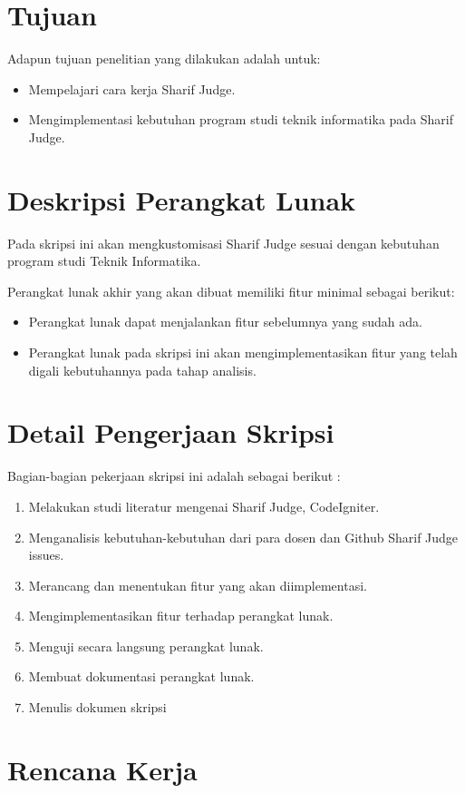 \documentclass[a4paper,twoside]{article}
\begin{document}
\section{Tujuan}
Adapun tujuan penelitian yang dilakukan adalah untuk:
\begin{itemize}
	\item Mempelajari cara kerja Sharif Judge.
	\item Mengimplementasi kebutuhan program studi teknik informatika pada Sharif Judge.
\end{itemize}

\section{Deskripsi Perangkat Lunak}
Pada skripsi ini akan mengkustomisasi Sharif Judge sesuai dengan kebutuhan program studi Teknik Informatika.

Perangkat lunak akhir yang akan dibuat memiliki fitur minimal sebagai berikut:
\begin{itemize}
	\item Perangkat lunak dapat menjalankan fitur sebelumnya yang sudah ada.
	\item Perangkat lunak pada skripsi ini akan mengimplementasikan fitur yang telah digali kebutuhannya pada tahap analisis.
		
\end{itemize}

\section{Detail Pengerjaan Skripsi}
Bagian-bagian pekerjaan skripsi ini adalah sebagai berikut :
	\begin{enumerate}
		\item Melakukan studi literatur mengenai Sharif Judge, CodeIgniter.
		\item Menganalisis kebutuhan-kebutuhan dari para dosen dan Github Sharif Judge issues.
		\item Merancang dan menentukan fitur yang akan diimplementasi.
		\item Mengimplementasikan fitur terhadap perangkat lunak.
		\item Menguji secara langsung perangkat lunak.
		\item Membuat dokumentasi perangkat lunak.
		\item Menulis dokumen skripsi
	\end{enumerate}

\section{Rencana Kerja}
\end{document}
